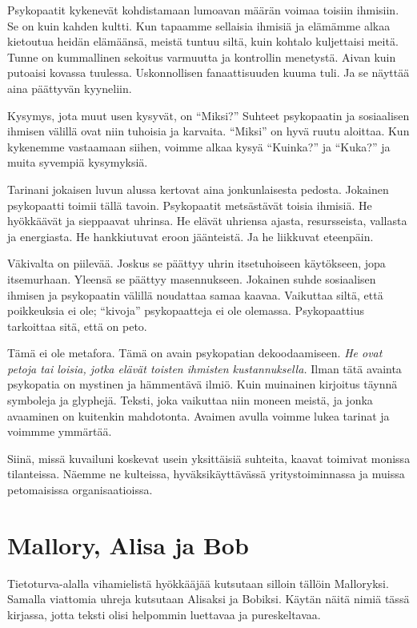 Psykopaatit kykenevät kohdistamaan lumoavan määrän voimaa toisiin ihmisiin. Se on kuin kahden kultti. Kun tapaamme sellaisia ihmisiä ja elämämme alkaa kietoutua heidän elämäänsä, meistä tuntuu siltä, kuin kohtalo kuljettaisi meitä. Tunne on kummallinen sekoitus varmuutta ja kontrollin menetystä. Aivan kuin putoaisi kovassa tuulessa. Uskonnollisen fanaattisuuden kuuma tuli. Ja se näyttää aina päättyvän kyyneliin.

Kysymys, jota muut usen kysyvät, on ``Miksi?'' Suhteet psykopaatin ja sosiaalisen ihmisen välillä ovat niin tuhoisia ja karvaita. ``Miksi'' on hyvä ruutu aloittaa. Kun kykenemme vastaamaan siihen, voimme alkaa kysyä ``Kuinka?'' ja ``Kuka?'' ja muita syvempiä kysymyksiä.

Tarinani jokaisen luvun alussa kertovat aina jonkunlaisesta pedosta. Jokainen psykopaatti toimii tällä tavoin. Psykopaatit metsästävät toisia ihmisiä. He hyökkäävät ja sieppaavat uhrinsa. He elävät uhriensa ajasta, resursseista, vallasta ja energiasta. He hankkiutuvat eroon jäänteistä. Ja he liikkuvat eteenpäin.

Väkivalta on piilevää. Joskus se päättyy uhrin itsetuhoiseen käytökseen, jopa itsemurhaan. Yleensä se päättyy masennukseen. Jokainen suhde sosiaalisen ihmisen ja psykopaatin välillä noudattaa samaa kaavaa. Vaikuttaa siltä, että poikkeuksia ei ole; ``kivoja'' psykopaatteja ei ole olemassa. Psykopaattius tarkoittaa sitä, että on peto.

Tämä ei ole metafora. Tämä on avain psykopatian dekoodaamiseen. \emph{He ovat petoja tai loisia, jotka elävät toisten ihmisten kustannuksella.} Ilman tätä avainta psykopatia on mystinen ja hämmentävä ilmiö. Kuin muinainen kirjoitus täynnä symboleja ja glyphejä. Teksti, joka vaikuttaa niin moneen meistä, ja jonka avaaminen on kuitenkin mahdotonta. Avaimen avulla voimme lukea tarinat ja voimmme ymmärtää.

Siinä, missä kuvailuni koskevat usein yksittäisiä suhteita, kaavat toimivat monissa tilanteissa. Näemme ne kulteissa, hyväksikäyttävässä yritystoiminnassa ja muissa petomaisissa organisaatioissa.

\section{Mallory, Alisa ja Bob}

Tietoturva-alalla vihamielistä hyökkääjää kutsutaan silloin tällöin Malloryksi. Samalla viattomia uhreja kutsutaan Alisaksi ja Bobiksi. Käytän näitä nimiä tässä kirjassa, jotta teksti olisi helpommin luettavaa ja pureskeltavaa.


